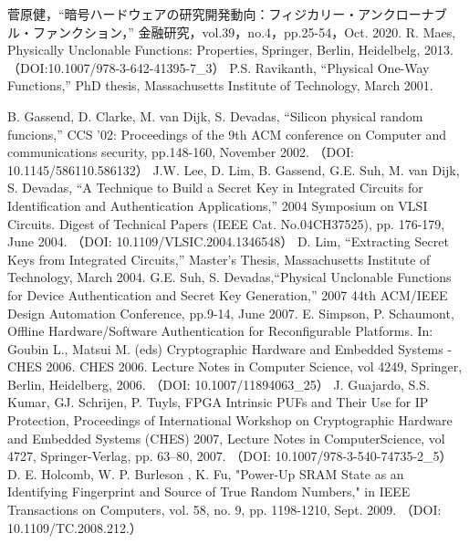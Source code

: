 \documentclass[technicalreport]{ieicej} %
\begin{document}

%
%
\begin{thebibliography}{99}%
  菅原健，“暗号ハードウェアの研究開発動向：フィジカリー・アンクローナブル・ファンクション，”
  金融研究，vol.39，no.4，pp.25-54，Oct. 2020.
  R. Maes, Physically Unclonable Functions: Properties, Springer, Berlin, Heidelbelg, 2013.
  （DOI:10.1007/978-3-642-41395-7\_3）
  P.S. Ravikanth, “Physical One-Way Functions,” PhD thesis,
  Massachusetts Institute of Technology, March 2001.

  B. Gassend, D. Clarke, M. van Dijk, S. Devadas, “Silicon physical random funcions,”
  CCS '02: Proceedings of the 9th ACM conference on Computer and communications security,
  pp.148-160, November 2002. （DOI: 10.1145/586110.586132）
  J.W. Lee, D. Lim, B. Gassend, G.E. Suh, M. van Dijk, S. Devadas,
  “A Technique to Build a Secret Key in Integrated Circuits for Identification and Authentication Applications,”
  2004 Symposium on VLSI Circuits. Digest of Technical Papers (IEEE Cat. No.04CH37525),
  pp. 176-179, June 2004. （DOI: 10.1109/VLSIC.2004.1346548）
  D. Lim, “Extracting Secret Keys from Integrated Circuits,” Master's Thesis,
  Massachusetts Institute of Technology, March 2004.
  G.E. Suh, S. Devadas,“Physical Unclonable Functions for Device Authentication and Secret Key Generation,”
  2007 44th ACM/IEEE Design Automation Conference, pp.9-14, June 2007.
  E. Simpson, P. Schaumont, Offline Hardware/Software Authentication for Reconfigurable Platforms.
  In: Goubin L., Matsui M. (eds) Cryptographic Hardware and Embedded Systems - CHES 2006.
  CHES 2006. Lecture Notes in Computer Science, vol 4249, Springer, Berlin, Heidelberg, 2006.
  （DOI: 10.1007/11894063\_25）
  J. Guajardo, S.S. Kumar, GJ. Schrijen, P. Tuyls, FPGA Intrinsic PUFs and Their Use for IP Protection,
  Proceedings of International Workshop on Cryptographic Hardware and Embedded Systems (CHES) 2007,
  Lecture Notes in ComputerScience, vol 4727, Springer-Verlag, pp. 63–80, 2007.
  （DOI: 10.1007/978-3-540-74735-2\_5）
  D. E. Holcomb, W. P. Burleson , K. Fu,
  "Power-Up SRAM State as an Identifying Fingerprint and Source of True Random Numbers,"
  in IEEE Transactions on Computers, vol. 58, no. 9, pp. 1198-1210, Sept. 2009.
  （DOI: 10.1109/TC.2008.212.）


\end{thebibliography}
\end{document}
